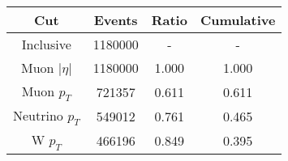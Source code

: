 \begin{tabular}{|c||c|c|c|}
\hline
Cut & Events & Ratio & Cumulative \\\hline
Inclusive & 1180000 & - & - \\
Muon $|\eta|$ & 1180000 & 1.000 & 1.000 \\
Muon $p_{T}$ & 721357 & 0.611 & 0.611 \\
Neutrino $p_{T}$ & 549012 & 0.761 & 0.465 \\
W $p_{T}$ & 466196 & 0.849 & 0.395 \\
\end{tabular}